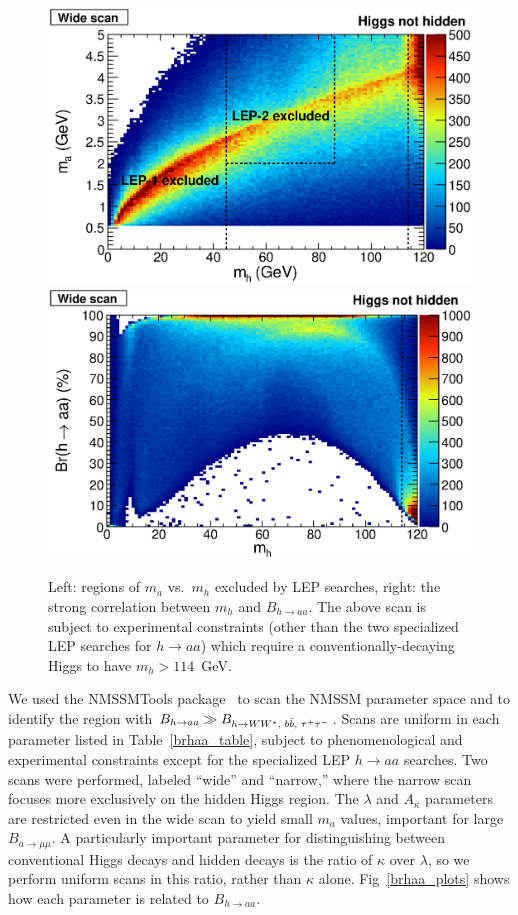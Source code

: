 \documentclass[aps,12pt,superscriptaddress,nofootinbib,floatfix,showpacs]{revtex4}
\begin{document}
\begin{figure}[htb]
\begin{center}
\includegraphics[width=0.5\linewidth]{plots/mass_exclusion.eps}%
\includegraphics[width=0.5\linewidth]{plots/mh_brhaa.eps}
\caption{Left: regions of $m_a$ vs.\ $m_h$ excluded by LEP searches,
  right: the strong correlation between $m_h$ and $B_{h \to aa}$.  The above scan is subject to experimental constraints (other
  than the two specialized LEP searches for $h\to aa$) which require a
  conventionally-decaying Higgs to have $m_h >
  114$~GeV. \label{mass_exclusion}}
\end{center}
\end{figure}

We used the NMSSMTools
package~\cite{nmssmtools1,nmssmtools2,nmssmtools3} to scan the NMSSM
parameter space and to identify the region with $B_{h \to aa}
\gg B_{h \to WW^*\mbox{\scriptsize, } b\bar{b}\mbox{\scriptsize, }\tau^+\tau^-}$.
Scans are uniform in each parameter listed in Table~\ref{brhaa_table},
subject to phenomenological and experimental constraints except for
the specialized LEP $h\to aa$ searches.  Two scans were performed,
labeled ``wide'' and ``narrow,'' where the narrow scan focuses more
exclusively on the hidden Higgs region.  The $\lambda$ and $A_\kappa$
parameters are restricted even in the wide scan to yield small $m_a$
values, important for large $B_{a\to\mu\mu}$.  A particularly
important parameter for distinguishing between conventional Higgs
decays and hidden decays is the ratio of $\kappa$ over $\lambda$, so
we perform uniform scans in this ratio, rather than $\kappa$ alone.
Fig~\ref{brhaa_plots} shows how each parameter is related to
$B_{h \to aa}$.
\end{document}
